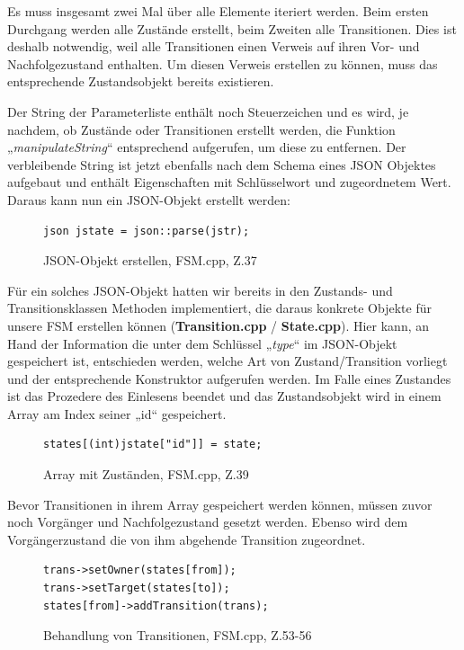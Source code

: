 Es muss insgesamt zwei Mal über alle Elemente iteriert werden. Beim ersten
Durchgang werden alle Zustände erstellt, beim Zweiten alle Transitionen. Dies
ist deshalb notwendig, weil alle Transitionen einen Verweis auf ihren Vor- und
Nachfolgezustand enthalten. Um diesen Verweis erstellen zu können, muss das
entsprechende Zustandsobjekt bereits existieren.

Der String der Parameterliste enthält noch Steuerzeichen und es wird, je
nachdem, ob Zustände oder Transitionen erstellt werden, die Funktion
„\textit{manipulateString}“ entsprechend aufgerufen, um diese zu entfernen. Der
verbleibende String ist jetzt ebenfalls nach dem Schema eines JSON Objektes
aufgebaut und enthält Eigenschaften mit Schlüsselwort und zugeordnetem Wert.
Daraus kann nun ein JSON-Objekt erstellt werden:

\begin{figure}[thp]
\begin{lstlisting}[style=json]
json jstate = json::parse(jstr);

\end{lstlisting}

\centering
\caption{JSON-Objekt erstellen, FSM.cpp, Z.37}
\end{figure}


Für ein solches JSON-Objekt hatten wir bereits in den Zustands- und
Transitionsklassen Methoden implementiert, die daraus konkrete Objekte für unsere
FSM erstellen können (\textbf{Transition.cpp} / \textbf{State.cpp}).
Hier kann, an Hand der Information die unter dem Schlüssel „\textit{type}“ im JSON-Objekt
gespeichert ist, entschieden werden, welche Art von Zustand/Transition vorliegt
und der entsprechende Konstruktor aufgerufen werden.
Im Falle eines Zustandes ist das Prozedere des Einlesens beendet und das
Zustandsobjekt wird in einem Array am Index seiner „id“ gespeichert.

\begin{figure}[thp]
\begin{lstlisting}
states[(int)jstate["id"]] = state;

\end{lstlisting}
\centering
\caption{Array mit Zuständen, FSM.cpp, Z.39}
\end{figure}



Bevor Transitionen in ihrem Array gespeichert werden können, müssen zuvor noch
Vorgänger und Nachfolgezustand gesetzt werden. Ebenso wird dem Vorgängerzustand
die von ihm abgehende Transition zugeordnet.

\begin{figure}[thp]
\begin{lstlisting}[style=json]
trans->setOwner(states[from]);
trans->setTarget(states[to]);
states[from]->addTransition(trans);

\end{lstlisting}
\centering
\caption{Behandlung von Transitionen, FSM.cpp, Z.53-56}
\end{figure}

